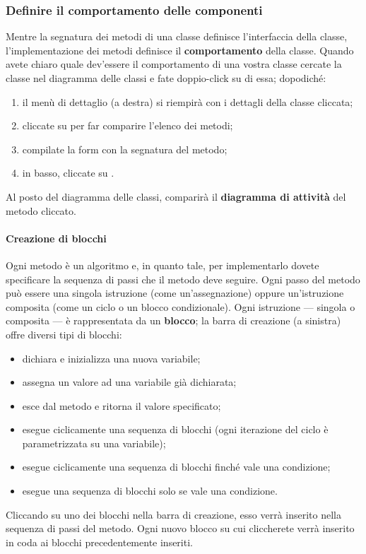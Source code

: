 \subsubsection{Definire il comportamento delle componenti} \label{sec:activity}
Mentre la segnatura dei metodi di una classe definisce l'interfaccia della classe, l'implementazione dei metodi definisce il \textbf{comportamento} della classe. Quando avete chiaro quale dev'essere il comportamento di una vostra classe cercate la classe nel diagramma delle classi e fate doppio-click su di essa; dopodiché:
\begin{enumerate}
	\item il menù di dettaglio (a destra) si riempirà con i dettagli della classe cliccata;
	\item cliccate su  per far comparire l'elenco dei metodi;
	\item compilate la form con la segnatura del metodo;
	\item in basso, cliccate su .
\end{enumerate}
Al posto del diagramma delle classi, comparirà il \textbf{diagramma di attività} del metodo cliccato.

\paragraph{Creazione di blocchi} Ogni metodo è un algoritmo e, in quanto tale, per implementarlo dovete specificare la sequenza di passi che il metodo deve seguire. Ogni passo del metodo può essere una singola istruzione (come un'assegnazione) oppure un'istruzione composita (come un ciclo o un blocco condizionale). Ogni istruzione --- singola o composita --- è rappresentata da un \textbf{blocco}; la barra di creazione (a sinistra) offre diversi tipi di blocchi:
\begin{itemize}
	\item {} dichiara e inizializza una nuova variabile;
	\item {} assegna un valore ad una variabile già dichiarata;
	\item {} esce dal metodo e ritorna il valore specificato;
	\item {} esegue ciclicamente una sequenza di blocchi (ogni iterazione del ciclo è parametrizzata su una variabile);
	\item {} esegue ciclicamente una sequenza di blocchi finché vale una condizione;
	\item {} esegue una sequenza di blocchi solo se vale una condizione.
\end{itemize}
Cliccando su uno dei blocchi nella barra di creazione, esso verrà inserito nella sequenza di passi del metodo. Ogni nuovo blocco su cui cliccherete  verrà inserito in coda ai blocchi precedentemente inseriti.

